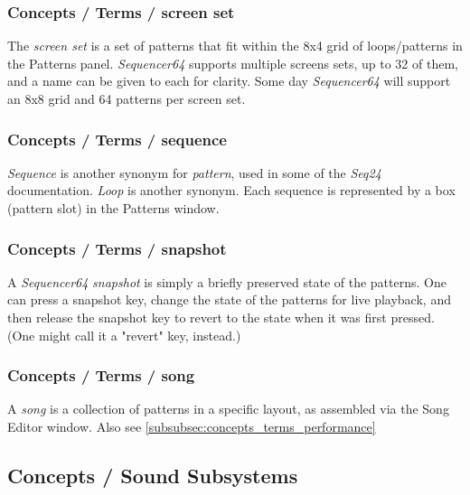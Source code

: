 \subsubsection{Concepts / Terms / screen set}
\label{subsubsec:concepts_terms_screen_set}

   The \textsl{screen set}
   is a set of patterns that fit within the 8x4 grid of loops/patterns in the
   Patterns panel.
   \textsl{Sequencer64} supports multiple screens sets, up to 32 of them,
   and a name can be given to each for clarity.
   Some day \textsl{Sequencer64} will support an 8x8 grid and 64 patterns per
   screen set.

\subsubsection{Concepts / Terms / sequence}
\label{subsubsec:concepts_terms_sequence}

   \textsl{Sequence} is
   another synonym for \textsl{pattern}, used in some of the \textsl{Seq24}
   documentation.  \textsl{Loop} is another synonym.
   Each sequence is represented by a box (pattern slot) in the Patterns window.

\subsubsection{Concepts / Terms / snapshot}
\label{subsubsec:concepts_terms_snapshot}

   A \textsl{Sequencer64} \textsl{snapshot} is simply a briefly preserved
   state of the patterns.  One can press a snapshot key, change the state of
   the patterns for live playback, and then release the snapshot key to
   revert to the state when it was first pressed.  (One might call it a
   "revert" key, instead.)

\subsubsection{Concepts / Terms / song}
\label{subsubsec:concepts_terms_song}

   A \textsl{song} is a collection of patterns in a specific layout, as
   assembled via the Song Editor window.
   Also see \ref{subsubsec:concepts_terms_performance}

\subsection{Concepts / Sound Subsystems}
\label{subsec:concepts_sound_subsystems}

